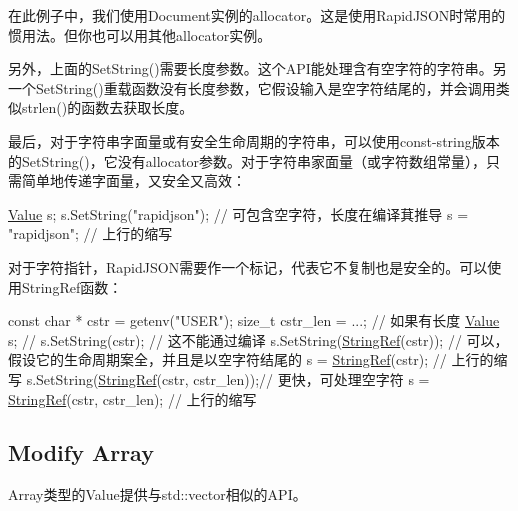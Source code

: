 在此例子中，我们使用{\ttfamily Document}实例的allocator。这是使用\+Rapid\+J\+S\+O\+N时常用的惯用法。但你也可以用其他allocator实例。

另外，上面的{\ttfamily Set\+String()}需要长度参数。这个\+A\+P\+I能处理含有空字符的字符串。另一个{\ttfamily Set\+String()}重载函数没有长度参数，它假设输入是空字符结尾的，并会调用类似{\ttfamily strlen()}的函数去获取长度。

最后，对于字符串字面量或有安全生命周期的字符串，可以使用const-\/string版本的{\ttfamily Set\+String()}，它没有allocator参数。对于字符串家面量（或字符数组常量），只需简单地传递字面量，又安全又高效：


\begin{DoxyCode}
\hyperlink{class_generic_value}{Value} s;
s.SetString(\textcolor{stringliteral}{"rapidjson"});    \textcolor{comment}{// 可包含空字符，长度在编译萁推导}
s = \textcolor{stringliteral}{"rapidjson"};             \textcolor{comment}{// 上行的缩写}
\end{DoxyCode}


对于字符指针，\+Rapid\+J\+S\+O\+N需要作一个标记，代表它不复制也是安全的。可以使用{\ttfamily String\+Ref}函数：


\begin{DoxyCode}
\textcolor{keyword}{const} \textcolor{keywordtype}{char} * cstr = getenv(\textcolor{stringliteral}{"USER"});
\textcolor{keywordtype}{size\_t} cstr\_len = ...;                 \textcolor{comment}{// 如果有长度}
\hyperlink{class_generic_value}{Value} s;
\textcolor{comment}{// s.SetString(cstr);                  // 这不能通过编译}
s.SetString(\hyperlink{struct_generic_string_ref_aa6b9fd9f6aa49405a574c362ba9af6b5}{StringRef}(cstr));          \textcolor{comment}{// 可以，假设它的生命周期案全，并且是以空字符结尾的}
s = \hyperlink{struct_generic_string_ref_aa6b9fd9f6aa49405a574c362ba9af6b5}{StringRef}(cstr);                   \textcolor{comment}{// 上行的缩写}
s.SetString(\hyperlink{struct_generic_string_ref_aa6b9fd9f6aa49405a574c362ba9af6b5}{StringRef}(cstr, cstr\_len));\textcolor{comment}{// 更快，可处理空字符}
s = \hyperlink{struct_generic_string_ref_aa6b9fd9f6aa49405a574c362ba9af6b5}{StringRef}(cstr, cstr\_len);         \textcolor{comment}{// 上行的缩写}
\end{DoxyCode}
\hypertarget{md_Cadriciel_Commun_Externe_RapidJSON_doc_tutorial.zh-cn_ModifyArray}{}\subsection{Modify Array}\label{md_Cadriciel_Commun_Externe_RapidJSON_doc_tutorial.zh-cn_ModifyArray}
Array类型的\+Value提供与{\ttfamily std\+::vector}相似的\+A\+P\+I。


